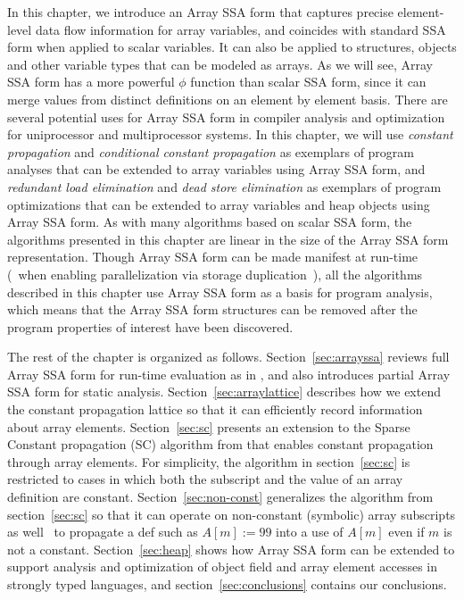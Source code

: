 In this chapter,
we introduce an Array SSA form 
that captures precise element-level data flow information for array variables, and
coincides with standard SSA form when applied to scalar variables.  
It can also be applied to structures, objects and other variable types
that can be modeled as arrays.
As we will see,  Array SSA form
has a more powerful $\phi$ function than scalar SSA form, since it can
merge values from distinct definitions on an element by element
basis. 
There are several potential uses for Array SSA form in compiler
analysis
and optimization for uniprocessor and multiprocessor systems.
In this chapter, we will use
{\it constant propagation} and
{\it conditional constant propagation} 
as exemplars of program analyses that can be extended to array variables
using Array SSA form, and {\em redundant load elimination} and {\em dead store
elimination} as exemplars of program optimizations that can be extended to array variables and heap objects using Array SSA form.
As with many algorithms based on scalar SSA form, the algorithms presented in this chapter are linear in the size of the Array SSA form representation.
Though Array SSA form can be made manifest at run-time (\eg\ when enabling parallelization via storage duplication~\cite{KnSa98}), all the algorithms described in this chapter  use Array SSA form as a basis
for program analysis, 
which means that the Array SSA form
structures can be removed after the  program properties
of interest
have been discovered.

The rest of the chapter is organized as follows.
Section~\ref{sec:arrayssa} reviews full Array SSA form for run-time
evaluation as in
\cite{KnSa98}, and also introduces partial Array SSA form
for static analysis.  
Section~\ref{sec:arraylattice} describes how we
extend the constant
propagation lattice so that it can efficiently
record information about array
elements.                                       
Section~\ref{sec:sc} presents an extension to the Sparse
Constant propagation (SC) algorithm from \cite{WeZa91} that enables 
constant propagation through array elements.
For simplicity, the algorithm in section~\ref{sec:sc} is restricted
to cases in which both the subscript and the value of an
array definition are constant.
Section~\ref{sec:non-const} generalizes the algorithm from section~\ref{sec:sc} so that it can operate on non-constant (symbolic) array subscripts as well
\eg\ to propagate a def such as $A[m] := 99$ into a use of $A[m]$ even
if $m$ is not a constant.
Section~\ref{sec:heap} shows how Array SSA form can be extended to support
analysis and
optimization of 
object field and array element accesses in strongly typed languages,
and section~\ref{sec:conclusions} contains our conclusions.



